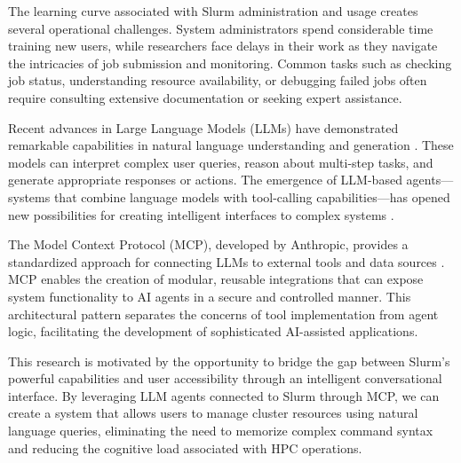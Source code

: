 The learning curve associated with Slurm administration and usage creates several operational challenges. System administrators spend considerable time training new users, while researchers face delays in their work as they navigate the intricacies of job submission and monitoring. Common tasks such as checking job status, understanding resource availability, or debugging failed jobs often require consulting extensive documentation or seeking expert assistance.

Recent advances in Large Language Models (LLMs) have demonstrated remarkable capabilities in natural language understanding and generation \cite{brown2020language, openai2023gpt4}. These models can interpret complex user queries, reason about multi-step tasks, and generate appropriate responses or actions. The emergence of LLM-based agents---systems that combine language models with tool-calling capabilities---has opened new possibilities for creating intelligent interfaces to complex systems \cite{xi2023rise, schick2023toolformer}.

The Model Context Protocol (MCP), developed by Anthropic, provides a standardized approach for connecting LLMs to external tools and data sources \cite{anthropic2024mcp}. MCP enables the creation of modular, reusable integrations that can expose system functionality to AI agents in a secure and controlled manner. This architectural pattern separates the concerns of tool implementation from agent logic, facilitating the development of sophisticated AI-assisted applications.

This research is motivated by the opportunity to bridge the gap between Slurm's powerful capabilities and user accessibility through an intelligent conversational interface. By leveraging LLM agents connected to Slurm through MCP, we can create a system that allows users to manage cluster resources using natural language queries, eliminating the need to memorize complex command syntax and reducing the cognitive load associated with HPC operations.


